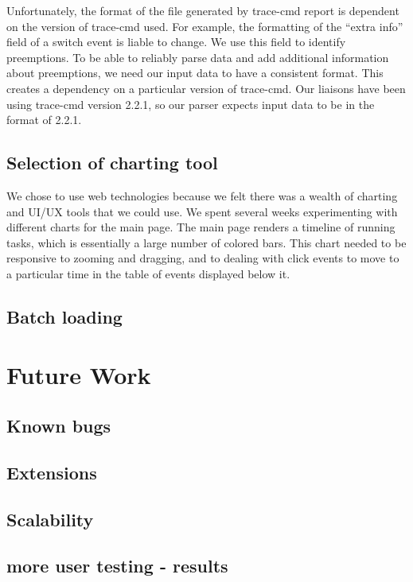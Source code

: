\documentclass[midyear]{hmcclinic}
\begin{document}
  Unfortunately, the format of the file generated by trace-cmd report is
  dependent on the version of trace-cmd used. For example, the formatting of the
  ``extra info'' field of a switch event is liable to change. We use this
  field to identify preemptions. To be able to reliably parse data and add
  additional information about preemptions, we need our input data to have
  a consistent format. This creates a dependency on a particular version
  of trace-cmd. Our liaisons have been using trace-cmd version 2.2.1, so
  our parser expects input data to be in the format of 2.2.1.
\subsection{Selection of charting tool} %
  We chose to use web technologies because we felt there was a wealth of
  charting and UI/UX tools that we could use. We spent several weeks
  experimenting with different charts for the main page. The main page renders a
  timeline of running tasks, which is essentially a large number of colored
  bars. This chart needed to be responsive to zooming and dragging, and to
  dealing with click events to move to a particular time in the table of events
  displayed below it.
\subsection{Batch loading}

\section{Future Work}
\subsection{Known bugs}
\subsection{Extensions}
\subsection{Scalability}
\subsection{more user testing - results}
\end{document}
